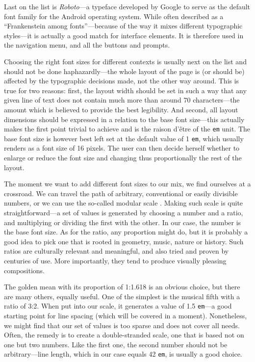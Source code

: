 \documentclass[thesis=M,english,hidelinks]{FITthesis}[2012/10/20]
\newcommand{\code}{\texttt}
\begin{document}
Last on the list is \textit{Roboto}---a typeface developed by Google to serve as the default font family for the Android operating system. While often described as a ``Frankenstein among fonts''---because of the way it mixes different typographic styles---it is actually a good match for interface elements. It is therefore used in the navigation menu, and all the buttons and prompts.

Choosing the right font sizes for different contexts is usually next on the list and should not be done haphazardly---the whole layout of the page is (or should be) affected by the typographic decisions made, not the other way around. This is true for two reasons: first, the layout width should be set in such a way that any given line of text does not contain much more than around 70 characters---the amount which is believed to provide the best legibility. And second, all layout dimensions should be expressed in a relation to the base font size---this actually makes the first point trivial to achieve and is the raison d'être of the \code{em} unit. The base font size is however best left set at the default value of 1 \code{em}, which usually renders as a font size of 16 pixels. The user can then decide herself whether to enlarge or reduce the font size and changing thus proportionally the rest of the layout.

The moment we want to add different font sizes to our mix, we find ourselves at a crossroad. We can travel the path of arbitrary, conventional or easily divisible numbers, or we can use the so-called modular scale \cite{brown}. Making such scale is quite straightforward---a set of values is generated by choosing a number and a ratio, and multiplying or dividing the first with the other. In our case, the number is the base font size. As for the ratio, any proportion might do, but it is probably a good idea to pick one that is rooted in geometry, music, nature or history. Such ratios are culturally relevant and meaningful, and also tried and proven by centuries of use. More importantly, they tend to produce visually pleasing compositions.

The golden mean with its proportion of 1:1.618 is an obvious choice, but there are many others, equally useful. One of the simplest is the musical fifth with a ratio of 3:2. When put into our scale, it generates a value of 1.5 \code{em}---a good starting point for line spacing (which will be covered in a moment). Nonetheless, we might find that our set of values is too sparse and does not cover all needs. Often, the remedy is to create a double-stranded scale, one that is based not on one but two numbers. Like the first one, the second number should not be arbitrary---line length, which in our case equals 42 \code{em}, is usually a good choice.
\end{document}
